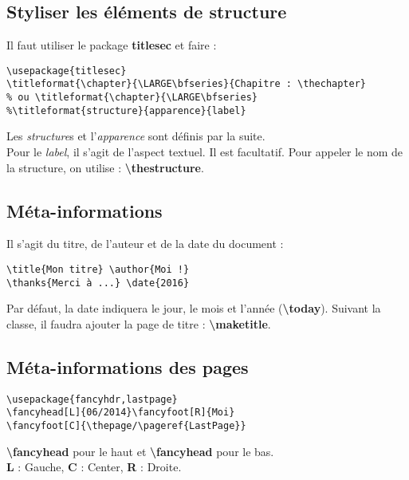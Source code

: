         \subsection{Styliser les éléments de structure}
            Il faut utiliser le package \textbf{titlesec} et faire :
            \begin{lstlisting}
\usepackage{titlesec}
\titleformat{\chapter}{\LARGE\bfseries}{Chapitre : \thechapter}
% ou \titleformat{\chapter}{\LARGE\bfseries}
%\titleformat{structure}{apparence}{label}
            \end{lstlisting}
            Les \textit{structure}s et l'\textit{apparence} sont définis par la suite.\\Pour le \textit{label}, il s'agit de l'aspect textuel. Il est facultatif. Pour appeler le nom de la structure, on utilise : \textbf{\textbackslash thestructure}.

        \subsection{Méta-informations}
            Il s'agit du titre, de l'auteur et de la date du document :
            \begin{lstlisting}
\title{Mon titre} \author{Moi !}
\thanks{Merci à ...} \date{2016}
            \end{lstlisting}
            Par défaut, la date indiquera le jour, le mois et l'année (\textbf{\textbackslash today}). Suivant la classe, il faudra ajouter la page de titre : \textbf{\textbackslash maketitle}.
        \subsection{Méta-informations des pages}
            \begin{lstlisting}
\usepackage{fancyhdr,lastpage}
\fancyhead[L]{06/2014}\fancyfoot[R]{Moi}
\fancyfoot[C]{\thepage/\pageref{LastPage}}
            \end{lstlisting}
            \textbf{\textbackslash fancyhead} pour le haut et \textbf{\textbackslash fancyhead} pour le bas.\\
            \textbf{L} : Gauche, \textbf{C} : Center, \textbf{R} : Droite.

